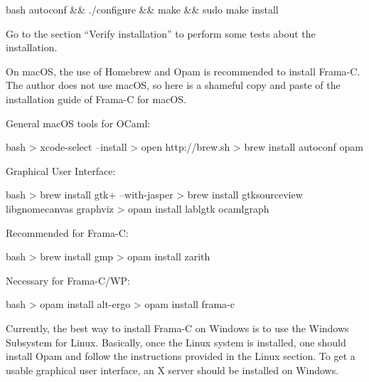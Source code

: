\begin{CodeBlock}{bash}
autoconf && ./configure && make && sudo make install
\end{CodeBlock}



Go to the section ``Verify installation'' to perform some tests about
the installation.





On macOS, the use of Homebrew and Opam is recommended to install Frama-C.
The author does not use macOS, so here is a shameful copy and paste of the
installation guide of Frama-C for macOS.




General macOS tools for OCaml:



\begin{CodeBlock}{bash}
> xcode-select --install
> open http://brew.sh
> brew install autoconf opam
\end{CodeBlock}



Graphical User Interface:



\begin{CodeBlock}{bash}
> brew install gtk+ --with-jasper
> brew install gtksourceview libgnomecanvas graphviz
> opam install lablgtk ocamlgraph
\end{CodeBlock}



Recommended for Frama-C:



\begin{CodeBlock}{bash}
> brew install gmp
> opam install zarith
\end{CodeBlock}



Necessary for Frama-C/WP:



\begin{CodeBlock}{bash}
> opam install alt-ergo
> opam install frama-c
\end{CodeBlock}





Currently, the best way to install Frama-C on Windows is to use the
Windows Subsystem for Linux. Basically, once the Linux system is installed,
one should install Opam and follow the instructions provided in the Linux
section. To get a usable graphical user interface, an X server should be
installed on Windows.


